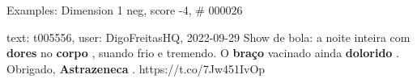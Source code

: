 \begin{frame}{Examples: Dimension 1 neg, score -4, \# 000026}
\footnotesize
\begin{alertblock}{text: t005556, user: DigoFreitasHQ, 2022-09-29}
Show de bola: a noite inteira com \textbf{dores} no \textbf{corpo} , suando 
frio e tremendo. O \textbf{braço} vacinado ainda \textbf{dolorido} . Obrigado, 
\textbf{Astrazeneca} . https://t.co/7Jw451IvOp 
\end{alertblock}
\end{frame}
